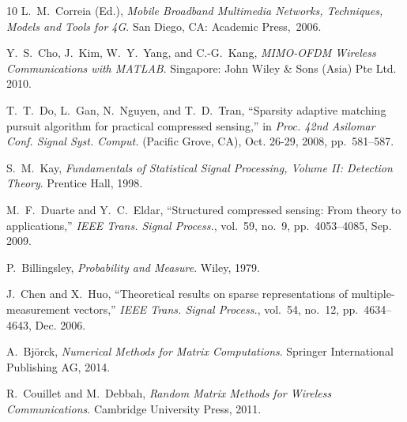 \documentclass[final]{IEEEtran}
\begin{document}
\begin{thebibliography}{10}
 L.~M.~Correia (Ed.), \emph{Mobile Broadband Multimedia Networks, Techniques, Models
 and Tools for 4G}. San Diego, CA: Academic Press,~2006.

 Y.~S.~Cho, J.~Kim, W.~Y.~Yang, and C.-G.~Kang, \emph{MIMO-OFDM Wireless Communications
 with MATLAB}. Singapore: John Wiley \& Sons (Asia) Pte Ltd. 2010.

 T.~T.~Do, L.~Gan, N.~Nguyen, and T.~D.~Tran, ``Sparsity adaptive matching pursuit algorithm
 for practical compressed sensing,'' in {\em Proc. 42nd Asilomar Conf. Signal Syst. Comput.}
 (Pacific Grove, CA), Oct. 26-29, 2008, pp.~581--587.

 S.~M.~Kay, \emph{Fundamentals of Statistical Signal Processing, Volume II: Detection
 Theory}. Prentice Hall, 1998.

 M.~F.~Duarte and Y.~C.~Eldar, ``Structured compressed sensing: From theory to applications,''
 {\it IEEE Trans. Signal Process.}, vol.~59, no.~9, pp.~4053--4085, Sep. 2009.

 P.~Billingsley, {\em Probability and Measure}. Wiley, 1979.

 J.~Chen and X.~Huo, ``Theoretical results on sparse representations of multiple-measurement
 vectors,'' \emph{IEEE Trans. Signal Process.}, vol.~54, no.~12, pp.~4634--4643, Dec. 2006.

 A.~Bj\"{o}rck, \emph{Numerical Methods for Matrix Computations}. Springer International
 Publishing AG, 2014.

 R.~Couillet and M.~Debbah, \emph{Random Matrix Methods for Wireless Communications}.
 Cambridge University Press, 2011.

\end{thebibliography}
\end{document}
